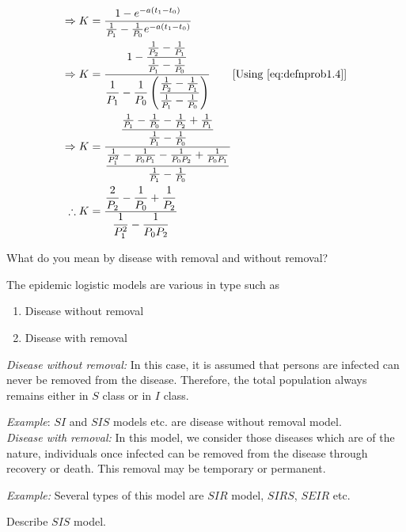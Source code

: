 \documentclass[../main-sheet.tex]{subfiles}
\begin{document}
\begin{soln}
\begin{align*}
        \Rightarrow\; &K=\frac{ 1-e^{-a(t_1-t_0)}}{\frac{1}{P_1}-\frac{1}{P_0}e^{-a(t_1-t_0)}}\\
        \Rightarrow\; &K=\frac{\displaystyle 1-\frac{\frac{1}{P_2}-\frac{1}{P_1}}{\frac{1}{P_1}-\frac{1}{P_0}} }{\displaystyle \frac{1}{P_1}-\frac{1}{P_0}\left( \frac{\frac{1}{P_2}-\frac{1}{P_1}}{\frac{1}{P_1}-\frac{1}{P_0}} \right)}\qquad [\text{Using \eqref{eq:defnprob1.4}}]\\
        \Rightarrow\; &K=\frac{\displaystyle \frac{\frac{1}{P_1}-\frac{1}{P_0}-\frac{1}{P_2}+\frac{1}{P_1}}{\frac{1}{P_1}-\frac{1}{P_0}}}{\displaystyle \frac{\frac{1}{P_1^2}-\frac{1}{P_0P_1}-\frac{1}{P_0P_2}+\frac{1}{P_0P_1}}{\frac{1}{P_1}-\frac{1}{P_0}}}\\
        \therefore\; &K=\frac{\displaystyle \frac{2}{P_2}-\frac{1}{P_0}+\frac{1}{P_2}}{\displaystyle \frac{1}{P_1^2}-\frac{1}{P_0P_2}}
    \end{align*}
\end{soln}
\begin{prob}
    What do you mean by disease with removal and without removal?
\end{prob}
\begin{soln}
    The epidemic logistic models are various in type such as
    \begin{enumerate}[label=(\roman*)]
        \item Disease without removal
        \item Disease with removal
    \end{enumerate}
    \emph{Disease without removal:} In this case, it is assumed that persons are infected can never be removed from the disease. Therefore, the total population always remains either in \(S\) class or in \(I\) class.

    \emph{Example}: \(SI\) and \(SIS\) models etc. are disease without removal model.\\

    \emph{Disease with removal:} In this model, we consider those diseases which are of the nature, individuals once infected can be removed from the disease through recovery or death. This removal may be temporary or permanent.

    \emph{Example:} Several types of this model are \(SIR\) model, \(SIRS\), \(SEIR\) etc.
\end{soln}
\begin{prob}
    Describe \(SIS\) model.
\end{prob}
\end{document}
